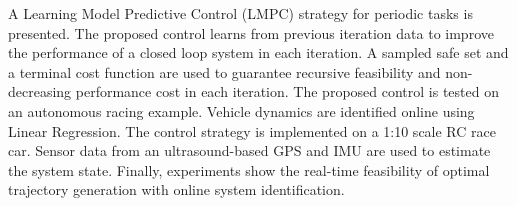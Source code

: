\documentclass[10pt,twoside,a4paper,fleqn]{report}
\theoremstyle{definition}
\begin{document}

A Learning Model Predictive Control (LMPC) strategy for periodic tasks is presented. The proposed control learns from previous iteration data to improve the performance of a closed loop system in each iteration. A sampled safe set and a terminal cost function are used to guarantee recursive feasibility and non-decreasing performance cost in each iteration. The proposed control is tested on an autonomous racing example. Vehicle dynamics are identified online using Linear Regression. The control strategy is implemented on a 1:10 scale RC race car. Sensor data from an ultrasound-based GPS and IMU are used to estimate the system state. Finally, experiments show the real-time feasibility of optimal trajectory generation with online system identification.

\end{document}
